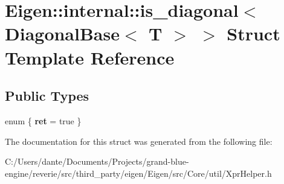 \hypertarget{struct_eigen_1_1internal_1_1is__diagonal_3_01_diagonal_base_3_01_t_01_4_01_4}{}\section{Eigen\+::internal\+::is\+\_\+diagonal$<$ Diagonal\+Base$<$ T $>$ $>$ Struct Template Reference}
\label{struct_eigen_1_1internal_1_1is__diagonal_3_01_diagonal_base_3_01_t_01_4_01_4}
\subsection*{Public Types}
\begin{DoxyCompactItemize}
\item 
\mbox{\label{struct_eigen_1_1internal_1_1is__diagonal_3_01_diagonal_base_3_01_t_01_4_01_4_a0234599840db83f17471d863af1d26c5}} 
enum \{ {\bfseries ret} = true
 \}
\end{DoxyCompactItemize}


The documentation for this struct was generated from the following file\+:\begin{DoxyCompactItemize}
\item 
C\+:/\+Users/dante/\+Documents/\+Projects/grand-\/blue-\/engine/reverie/src/third\+\_\+party/eigen/\+Eigen/src/\+Core/util/Xpr\+Helper.\+h\end{DoxyCompactItemize}

